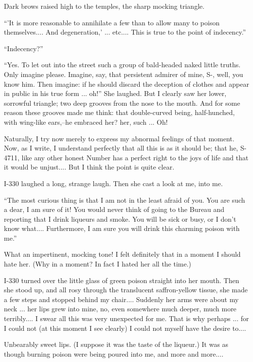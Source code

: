 \documentclass[11pt,openany]{book}
\begin{document}
Dark brows raised high to the temples, the sharp mocking triangle.

``'It is more reasonable to annihilate a few than to allow many to poison themselves.... And degeneration,' ... etc.... This is true to the point of indecency.''

``Indecency?''

``Yes. To let out into the street such a group of bald-headed naked little truths. Only imagine please. Imagine, say, that persistent admirer of mine, S-, well, you know him. Then imagine: if he should discard the deception of clothes and appear in public in his true form ... oh!'' She laughed. But I clearly saw her lower, sorrowful triangle; two deep grooves from the nose to the mouth. And for some reason these grooves made me think: that double-curved being, half-hunched, with wing-like ears,--he embraced her? her, such ... Oh!

Naturally, I try now merely to express my abnormal feelings of that moment. Now, as I write, I understand perfectly that all this is as it should be; that he, S-4711, like any other honest Number has a perfect right to the joys of life and that it would be unjust.... But I think the point is quite clear.

I-330 laughed a long, strange laugh. Then she cast a look at me, into me.

``The most curious thing is that I am not in the least afraid of you. You are such a dear, I am sure of it! You would never think of going to the Bureau and reporting that I drink liqueurs and smoke. You will be sick or busy, or I don't know what.... Furthermore, I am sure you will drink this charming poison with me.''

What an impertinent, mocking tone! I felt definitely that in a moment I should hate her. (Why in a moment? In fact I hated her all the time.)

I-330 turned over the little glass of green poison straight into her mouth. Then she stood up, and all rosy through the translucent saffron-yellow tissue, she made a few steps and stopped behind my chair.... Suddenly her arms were about my neck ... her lips grew into mine, no, even somewhere much deeper, much more terribly.... I swear all this was very unexpected for me. That is why perhaps ... for I could not (at this moment I see clearly) I could not myself have the desire to....

Unbearably sweet lips. (I suppose it was the taste of the liqueur.) It was as though burning poison were being poured into me, and more and more....
\end{document}
